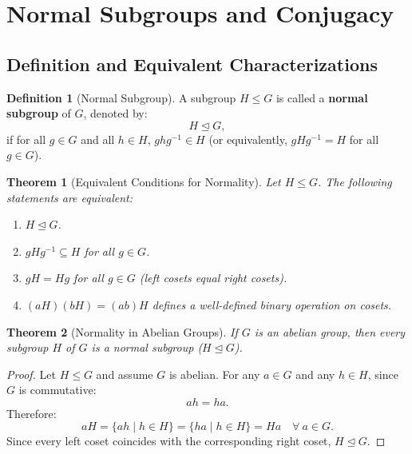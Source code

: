 \documentclass[12pt]{article}
\theoremstyle{definition}
\newtheorem{definition}{Definition}[section]
\theoremstyle{plain}
\newtheorem{theorem}{Theorem}[section]
\begin{document}
\section{Normal Subgroups and Conjugacy}

\subsection{Definition and Equivalent Characterizations}

\begin{definition}[Normal Subgroup]
A subgroup $H \le G$ is called a \textbf{normal subgroup} of $G$, denoted by:
\[
\boxed{H \trianglelefteq G},
\]
if for all $g \in G$ and all $h \in H$, $ghg^{-1} \in H$ (or equivalently, $gHg^{-1} = H$ for all $g \in G$).
\end{definition}

\begin{theorem}[Equivalent Conditions for Normality]
Let $H \le G$. The following statements are equivalent:
\begin{enumerate}
    \item $H \trianglelefteq G$.
    \item $gHg^{-1} \subseteq H$ for all $g \in G$.
    \item $gH = Hg$ for all $g \in G$ (left cosets equal right cosets).
    \item $(aH)(bH) = (ab)H$ defines a well-defined binary operation on cosets.
\end{enumerate}
\end{theorem}


\begin{theorem}[Normality in Abelian Groups]
If $G$ is an abelian group, then every subgroup $H$ of $G$ is a normal subgroup ($H \trianglelefteq G$).
\end{theorem}
\begin{proof}
Let $H \le G$ and assume $G$ is abelian.
For any $a \in G$ and any $h \in H$, since $G$ is commutative:
\[
ah = ha.
\]
Therefore:
\[
aH = \{ah \mid h \in H\} = \{ha \mid h \in H\} = Ha \quad \forall\ a \in G.
\]
Since every left coset coincides with the corresponding right coset, $H \trianglelefteq G$.
\end{proof}
\end{document}

